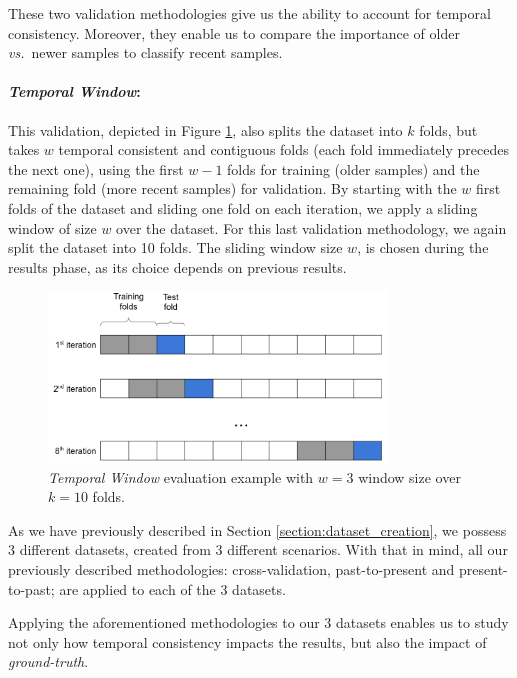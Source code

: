 These two validation methodologies give us the ability to account for temporal consistency.
Moreover, they enable us to compare the importance of older \textit{vs.}\ newer samples to classify recent samples.

\paragraph{\textit{Temporal Window}:} This validation, depicted in Figure \ref{fig:sliding_window}, also splits the dataset into $k$ folds, but takes $w$ temporal consistent and contiguous folds (\ie each fold immediately precedes the next one), using the first $w-1$ folds for training (older samples) and the remaining fold (more recent samples) for validation.
By starting with the $w$ first folds of the dataset and sliding one fold on each iteration, we apply a sliding window of size $w$ over the dataset.
For this last validation methodology, we again split the dataset into 10 folds.
The sliding window size $w$, is chosen during the results phase, as its choice depends on previous results.

\begin{figure}[!htb]
	\centering
	\includegraphics[width=0.8\textwidth]{Figures/dia_slidingwindow.png}
	\caption[\textit{Temporal Window} evaluation example.]{\textit{Temporal Window} evaluation example with $w=3$ window size over $k=10$ folds.}
	\label{fig:sliding_window}
\end{figure}

\medskip

As we have previously described in Section \ref{section:dataset_creation}, we possess 3 different datasets, created from 3 different scenarios.
With that in mind, all our previously described methodologies: cross-validation, past-to-present and present-to-past; are applied to each of the 3 datasets.

Applying the aforementioned methodologies to our 3 datasets enables us to study not only how temporal consistency impacts the results, but also the impact of \textit{ground-truth}.

